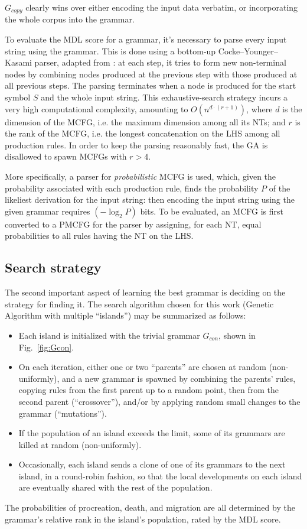 \documentclass{article}
\begin{document}
$G_{copy}$ clearly wins over either encoding the input data verbatim,
or incorporating the whole corpus into the grammar.

To evaluate the MDL score for a grammar, it's necessary to parse every input string using the grammar.
This is done using a bottom-up Cocke--Younger--Kasami parser, adapted from \cite{kallmeyer}:
at each step, it tries to form new non-terminal nodes by combining nodes produced at the previous step
with those produced at all previous steps.
The parsing terminates when a node is produced for the start symbol $S$ and the whole input string.
This exhaustive-search strategy incurs a very high computational complexity, amounting to
$O(n^{d\cdot(r+1)})$, where $d$ is the dimension of the MCFG, i.e. the maximum dimension among all its NTs;
and $r$ is the rank of the MCFG, i.e. the longest concatenation on the LHS among all production rules.
In order to keep the parsing reasonably fast, the GA is disallowed to spawn MCFGs with $r>4$.

More specifically, a parser for \emph{probabilistic} MCFG is used, which, given the probability associated
with each production rule, finds the probability $P$ of the likeliest derivation for the input string:
then encoding the input string using the given grammar requires $(-\log_2{P})$ bits.
To be evaluated, an MCFG is first converted to a PMCFG for the parser by assigning, for each NT,
equal probabilities to all rules having the NT on the LHS.

\subsection{Search strategy}

The second important aspect of learning the best grammar is deciding on the strategy for finding it.
The search algorithm chosen for this work (Genetic Algorithm with multiple ``islands'')
may be summarized as follows:
\begin{itemize}
  \item Each island is initialized with the trivial grammar $G_{con}$, shown in Fig.\ \ref{fig:Gcon}.
  \item On each iteration, either one or two ``parents'' are chosen at random (non-uniformly),
    and a new grammar is spawned by combining the parents' rules,
    copying rules from the first parent up to a random point, then from the second parent (``crossover''),
    and/or by applying random small changes to the grammar (``mutations'').
  \item If the population of an island exceeds the limit, some of its grammars are killed at random
    (non-uniformly).
  \item Occasionally, each island sends a clone of one of its grammars to the next island,
    in a round-robin fashion, so that the local developments on each island
    are eventually shared with the rest of the population.
\end{itemize}
The probabilities of procreation, death, and migration are all determined by the grammar's relative rank
in the island's population, rated by the MDL score.
\end{document}

